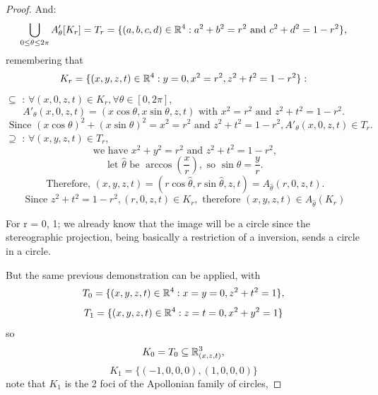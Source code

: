 \begin{proof}
And:
\begin{equation*}
\bigcup\limits_{0 \leq \theta \leq 2\pi} A'_{\theta}[K_{r}] = T_{r} = \{(a,b,c,d) \in \mathbb{R}^4 : a^2+b^2=r^2 \mbox{ and } c^2+d^2=1-r^2\},
\end{equation*}
remembering that
\begin{equation*}
    K_{r} = \{(x,y,z,t) \in \mathbb{R}^4 : y=0, x^2=r^2, z^2+t^2 = 1-r^2\}:
\end{equation*}
$\subseteq$ : $\forall (x,0,z,t) \in K_{r}, \forall \theta \in [0,2\pi]$,
\begin{equation*}
    A'_{\theta}(x,0,z,t) = (x \cos\theta, x \sin{\theta}, z, t) \mbox{ with } x^2 = r^2 \mbox{ and } z^2+t^2=1-r^2.
\end{equation*}
\begin{equation*}
\mbox{ Since } (x \cos\theta)^2+(x \sin\theta)^2=x^2=r^2 \mbox{ and } z^2+t^2=1-r^2, A'_{\theta}(x,0,z,t) \in T_{r}.
\end{equation*}
$\supseteq$ : $\forall (x,y,z,t) \in T_{r}$,\\
\begin{equation*}
    \mbox{ we have } x^2+y^2=r^2 \mbox{ and } z^2+t^2=1-r^2,
\end{equation*}
\begin{equation*}
\mbox{ let } \hat{\theta} \mbox{ be } \arccos\left(\frac{x}{r}\right), \mbox{ so } \sin \hat{\theta} = \frac{y}{r}.    
\end{equation*}
\begin{equation*}
\mbox{ Therefore, }  (x,y,z,t) = (r \cos\hat{\theta}, r \sin\hat{\theta}, z, t) = A_{\hat{\theta}}(r,0,z,t).
\end{equation*}
\begin{equation*}
\mbox{ Since } z^2+t^2=1-r^2, (r,0,z,t) \in K_{r}, \mbox{ therefore } (x,y,z,t) \in A_{\hat{\theta}}(K_{r})
\end{equation*}

For r = 0, 1; we already know that the image will be a circle since the stereographic projection, being basically a restriction of a inversion, sends a circle in a circle.

But the same previous demonstration can be applied, with
\begin{equation*}
T_0=\{(x,y,z,t) \in \mathbb{R}^4 : x=y=0, z^2+t^2=1\},    
\end{equation*}
\begin{equation*}
T_1=\{(x,y,z,t) \in \mathbb{R}^4 : z=t=0, x^2+y^2=1\}    
\end{equation*}
so 
\begin{equation*}
    K_0=T_0 \subseteq \mathbb{R}^3_{(x,z,t)},
\end{equation*}
\begin{equation*}
    K_1=\{(-1,0,0,0),(1,0,0,0)\}
\end{equation*}
note that $K_1$ is the 2 foci of the Apollonian family of circles,


\end{proof}
